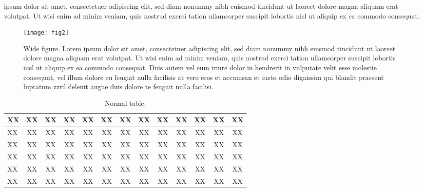 \documentclass{dsj}
\begin{document}
 ipsum dolor sit amet, consectetuer adipiscing elit, sed diam nonummy nibh euismod tincidunt ut laoreet dolore magna aliquam erat volutpat. Ut wisi enim ad minim veniam, quis nostrud exerci tation ullamcorper suscipit lobortis nisl ut aliquip ex ea commodo consequat.

\begin{figure*}[t]
\texttt{[image: fig2]}
\caption{\label{fig2}Wide figure. Lorem ipsum dolor sit amet, consectetuer adipiscing elit, sed diam nonummy nibh euismod tincidunt ut laoreet dolore magna aliquam erat volutpat. Ut wisi enim ad minim veniam, quis nostrud exerci tation ullamcorper suscipit lobortis nisl ut aliquip ex ea commodo consequat. Duis autem vel eum iriure dolor in hendrerit in vulputate velit esse molestie consequat, vel illum dolore eu feugiat nulla facilisis at vero eros et accumsan et iusto odio dignissim qui blandit praesent luptatum zzril delenit augue duis dolore te feugait nulla facilisi.}
\end{figure*}


\begin{table}
\caption{\label{tab1}Normal table.}
\begin{tabular*}{\hsize}{lcccccccccccc}
\hline
 XX & XX &XX & XX & XX & XX & XX &XX & XX & XX& XX & XX & XX\\
\hline
 XX & XX &XX & XX & XX & XX & XX &XX & XX & XX& XX & XX & XX\\
 XX & XX &XX & XX & XX & XX & XX &XX & XX & XX& XX & XX & XX\\
 XX & XX &XX & XX & XX & XX & XX &XX & XX & XX& XX & XX & XX\\
 XX & XX &XX & XX & XX & XX & XX &XX & XX & XX& XX & XX & XX\\
 XX & XX &XX & XX & XX & XX & XX &XX & XX & XX& XX & XX & XX\\
\hline
\end{tabular*}
\end{table}
\end{document}
